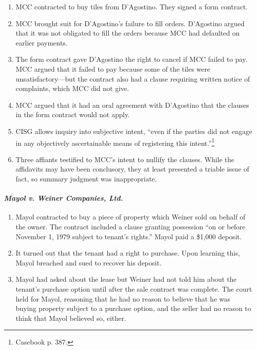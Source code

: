 \begin{enumerate}
    \item MCC contracted to buy tiles from D'Agostino. They signed a form 
    contract.
    \item MCC brought suit for D'Agostino's failure to fill orders. D'Agostino 
    argued that it was not obligated to fill the orders because MCC had 
    defaulted on earlier payments.
    \item The form contract gave D'Agostino the right to cancel if MCC failed 
    to pay. MCC argued that it failed to pay because some of the tiles were 
    unsatisfactory---but the contract also had a clause requiring written 
    notice of complaints, which MCC did not give.
    \item MCC argued that it had an oral agreement with D'Agostino that the 
    clauses in the form contract would not apply.
    \item CISG allows inquiry into subjective intent, ``even if the parties 
    did not engage in any objectively ascertainable means of registering this 
    intent.''\footnote{Casebook p. 387.}
    \item Three affiants testified to MCC's intent to nullify the clauses. 
    While the affidavits may have been conclusory, they at least presented a 
    triable issue of fact, so summary judgment was inappropriate.
\end{enumerate}

\paragraph{\emph{Mayol v. Weiner Companies, Ltd.}}

\begin{enumerate}
    \item Mayol contracted to buy a piece of property which Weiner sold on 
    behalf of the owner. The contract included a clause granting possession 
    ``on or before November 1, 1979 subject to tenant's rights.'' Mayol paid a 
    \$1,000 deposit.
    \item It turned out that the tenant had a right to purchase. Upon learning 
    this, Mayol breached and sued to recover his deposit.
    \item Mayol had asked about the lease but Weiner had not told him about 
    the tenant's purchase option until after the sale contract was complete. 
    The court held for Mayol, reasoning that he had no reason to believe that 
    he was buying property subject to a purchase option, and the seller had no 
    reason to think that Mayol believed so, either.
\end{enumerate}

